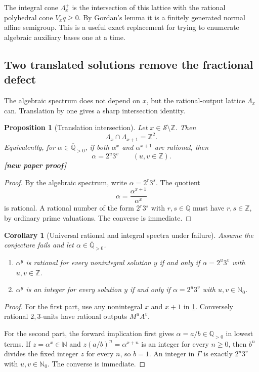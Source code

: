 \documentclass[11pt,oneside]{article}
\newtheorem{proposition}[theorem]{Proposition}
\newtheorem{corollary}[theorem]{Corollary}
\theoremstyle{definition}
\theoremstyle{remark}
\newcommand{\N}{\mathbb N}
\newcommand{\Nzero}{\mathbb N_0}
\newcommand{\Z}{\mathbb Z}
\newcommand{\Q}{\mathbb Q}
\newcommand{\Apos}{\overline{\mathbb Q}_{>0}}
\newcommand{\Sol}{\mathcal S}
\newcommand{\statusnew}{\textcolor{NewViolet}{\textbf{[new paper proof]}}}
\begin{document}
The integral cone $\Lambda_x^+$ is the intersection of this lattice with the rational
polyhedral cone $V_xq\ge0$.  By Gordan's lemma it is a finitely generated normal affine
semigroup.  This is a useful exact replacement for trying to enumerate algebraic auxiliary
bases one at a time.

\subsection{Two translated solutions remove the fractional defect}

The algebraic spectrum does not depend on $x$, but the rational-output lattice $\Lambda_x$
can.  Translation by one gives a sharp intersection identity.

\begin{proposition}[Translation intersection]\label{prop:translation-lattice}
Let $x\in\Sol\setminus\Z$.  Then
\[
  \Lambda_x\cap\Lambda_{x+1}=\Z^2.
\]
Equivalently, for $\alpha\in\Apos$, if both $\alpha^x$ and $\alpha^{x+1}$ are rational, then
\[
  \alpha=2^u3^v\qquad(u,v\in\Z).
\]
\statusnew
\end{proposition}

\begin{proof}
By the algebraic spectrum, write $\alpha=2^r3^s$.  The quotient
\[
  \alpha=\frac{\alpha^{x+1}}{\alpha^x}
\]
is rational.  A rational number of the form $2^r3^s$ with $r,s\in\Q$ must have
$r,s\in\Z$, by ordinary prime valuations.  The converse is immediate.
\end{proof}

\begin{corollary}[Universal rational and integral spectra under failure]
Assume the conjecture fails and let $\alpha\in\Apos$.
\begin{enumerate}
\item $\alpha^y$ is rational for every nonintegral solution $y$ if and only if
      $\alpha=2^u3^v$ with $u,v\in\Z$.
\item $\alpha^y$ is an integer for every solution $y$ if and only if
      $\alpha=2^u3^v$ with $u,v\in\Nzero$.
\end{enumerate}
\end{corollary}

\begin{proof}
For the first part, use any nonintegral $x$ and $x+1$ in
\cref{prop:translation-lattice}.  Conversely rational $2,3$-units have rational outputs
$M^uA^v$.

For the second part, the forward implication first gives
$\alpha=a/b\in\Q_{>0}$ in lowest terms.  If $z=\alpha^x\in\N$ and
$z(a/b)^n=\alpha^{x+n}$ is an integer for every $n\ge0$, then $b^n$ divides the fixed integer
$z$ for every $n$, so $b=1$.  An integer in $\Gamma$ is exactly $2^u3^v$ with
$u,v\in\Nzero$.  The converse is immediate.
\end{proof}
\end{document}
